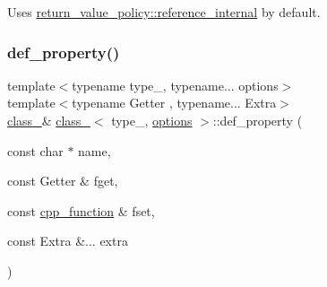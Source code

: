 Uses \mbox{\hyperlink{detail_2common_8h_adde72ab1fb0dd4b48a5232c349a53841aa39bc0596cb125c1605a78fbd287df7f}{return\+\_\+value\+\_\+policy\+::reference\+\_\+internal}} by default. 

\mbox{\label{classclass___a14c7125697800c6b8987c1c5f15aaea9}} 
\subsubsection{\texorpdfstring{def\_property()}{def\_property()}\hspace{0.1cm}{\footnotesize\ttfamily [2/3]}}
{\footnotesize\ttfamily template$<$typename type\+\_\+, typename... options$>$ \\
template$<$typename Getter , typename... Extra$>$ \\
\mbox{\hyperlink{classclass__}{class\+\_\+}}\& \mbox{\hyperlink{classclass__}{class\+\_\+}}$<$ type\+\_\+, \mbox{\hyperlink{classoptions}{options}} $>$\+::def\+\_\+property (\begin{DoxyParamCaption}\item[{const char $\ast$}]{name,  }\item[{const Getter \&}]{fget,  }\item[{const \mbox{\hyperlink{classcpp__function}{cpp\+\_\+function}} \&}]{fset,  }\item[{const Extra \&...}]{extra }\end{DoxyParamCaption})\hspace{0.3cm}{\ttfamily [inline]}}

\mbox{\label{classclass___ab976d0a595ac11629949c1faa8b2e09d}} 
